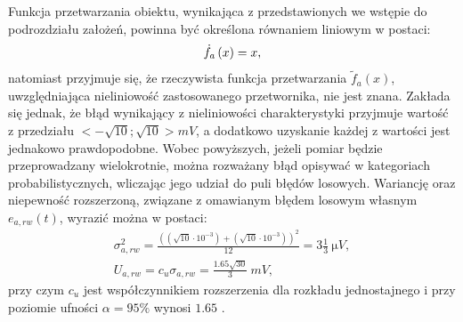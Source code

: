 Funkcja przetwarzania obiektu, wynikająca z przedstawionych we wstępie do podrozdziału założeń, powinna być określona równaniem liniowym w postaci:
\begin{equation}
\dot{f}_{a} \left(x\right) = x \label{eq:sym_parta_statfun},
\end{equation}
natomiast przyjmuje się, że rzeczywista funkcja przetwarzania $\tilde{f}_{a}(x)$, uwzględniająca nieliniowość zastosowanego przetwornika, nie jest znana. Zakłada się jednak, że błąd wynikający z nieliniowości charakterystyki przyjmuje wartość z przedziału $<-\sqrt{10};\sqrt{10}>\unit{mV}$, a dodatkowo uzyskanie każdej z wartości jest jednakowo prawdopodobne. Wobec powyższych, jeżeli pomiar będzie przeprowadzany wielokrotnie, można rozważany błąd opisywać w kategoriach probabilistycznych, wliczając jego udział do puli błędów losowych. Wariancję oraz niepewność rozszerzoną, związane z omawianym błędem losowym własnym $e_{a,rw}(t)$, wyrazić można w postaci:
\begin{gather}
\sigma_{a,rw}^{2} = \frac{\left( \left( \sqrt{10} \cdot 10^{-3} \right) + \left( \sqrt{10} \cdot 10^{-3} \right) \right)^{2}}{12} = 3 \frac{1}{3} ~\unit{\micro V} \label{eq:sym_parta_rand_self_var}, \\
U_{a,rw} = c_{u} \sigma_{a,rw} = \frac{1.65 \sqrt{30}}{3} ~\unit{mV} \label{eq:sym_parta_rand_self_unc},
\end{gather}
przy czym $c_{u}$ jest współczynnikiem rozszerzenia dla rozkładu jednostajnego i przy poziomie ufności $\alpha = 95\%$ wynosi $1.65$ \cite{jcgm_guide}.

